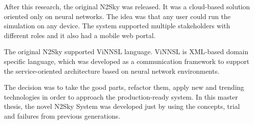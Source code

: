 After this research, the original N2Sky \cite{N2Sky} was released. It was a cloud-based solution oriented only on neural networks. The idea was that any user could run the simulation on any device. The system supported multiple stakeholders with different roles and it also had a mobile web portal. 

The original N2Sky supported ViNNSL language. ViNNSL is XML-based domain specific language, which was developed as a communication framework to support the service-oriented architecture based on neural network environments. 

The decision was to take the good parts, refactor them, apply new and trending technologies in order to approach the production-ready system. In this master thesis, the novel N2Sky System was developed just by using the concepts, trial and failures from previous generations. 

